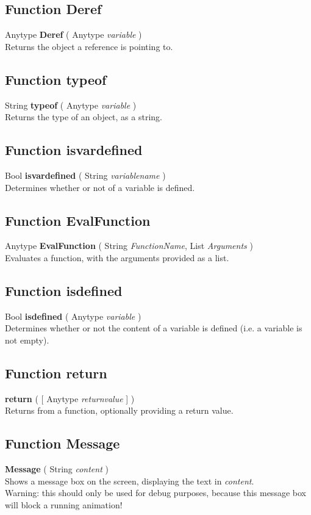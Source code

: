\documentclass[10pt]{book}
\newcommand{\var}[1]{\textit{#1}}
\begin{document}
\subsection{Function Deref \label{F:Deref}}
Anytype \textbf{Deref} ( Anytype \textit{variable} ) \\
Returns the object a reference is pointing to.

\subsection{Function typeof \label{F:typeof}}
String \textbf{typeof} ( Anytype \textit{variable} ) \\
Returns the type of an object, as a string.

\subsection{Function isvardefined \label{F:isvardefined}}
Bool \textbf{isvardefined} ( String \textit{variablename} ) \\
Determines whether or not of a variable is defined.


\subsection{Function EvalFunction \label{F:EvalFunction}}
Anytype \textbf{EvalFunction} ( String \textit{FunctionName}, List \textit{Arguments} ) \\
Evaluates a function, with the arguments provided as a list.

\subsection{Function isdefined \label{F:isdefined}}
Bool \textbf{isdefined} ( Anytype \textit{variable} ) \\
Determines whether or not the content of a variable is defined (i.e. a variable is not empty).

\subsection{Function return \label{F:return}}
\textbf{return} (  [ Anytype \textit{returnvalue} ] ) \\
Returns from a function, optionally providing a return value.

\subsection{Function Message \label{F:Message}}
\textbf{Message} ( String \textit{content} ) \\
Shows a message box on the screen, displaying the text in \var{content}. \\
Warning: this should only be used for debug purposes, because this message box will block a running animation!
\end{document}
